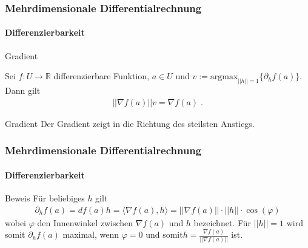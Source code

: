 \documentclass{beamer}
\begin{document}
\begin{frame}
    \frametitle{Mehrdimensionale Differentialrechnung}
\framesubtitle{Differenzierbarkeit}
    \begin{block}{Gradient}

Sei   $f: U \to \mathbb{R}$ differenzierbare Funktion,  $a \in U$ und $v := \text{argmax}_{ ||h|| = 1 } \{ \partial_h f(a) \}$.
Dann gilt 
\begin{align*}
|| \nabla f(a) || v =  \nabla f(a) \; .
\end{align*} 
\end{block}
\begin{block}{Gradient}
Der Gradient zeigt in die Richtung des steilsten Anstiegs.
\end{block}

 \end{frame}

\begin{frame}
    \frametitle{Mehrdimensionale Differentialrechnung}
\framesubtitle{Differenzierbarkeit}
    \begin{block}{Beweis}
Für beliebiges $h$ gilt 
\begin{align*}
\partial_h f(a) = df(a) h = \langle \nabla f(a) , h \rangle = || \nabla f(a)||  \cdot ||h|| \cdot \cos(\varphi) 
\end{align*} 
wobei $\varphi$ den Innenwinkel zwischen $\nabla f(a)$ und $h$ bezeichnet. Für $||h|| = 1$ wird somit $\partial_h f(a) $ maximal, wenn $\varphi = 0$ und somit$h =  \frac{\nabla f(a)}{||\nabla f(a)||}$ ist.
\end{block}

 \end{frame}
\end{document}
